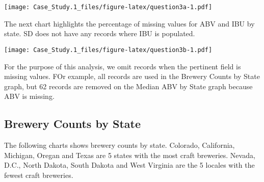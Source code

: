 \documentclass[]{article}
\newenvironment{Shaded}{\begin{snugshade}}{\end{snugshade}}
\newcommand{\DataTypeTok}[1]{\textcolor[rgb]{0.13,0.29,0.53}{#1}}
\newcommand{\DecValTok}[1]{\textcolor[rgb]{0.00,0.00,0.81}{#1}}
\newcommand{\FloatTok}[1]{\textcolor[rgb]{0.00,0.00,0.81}{#1}}
\newcommand{\KeywordTok}[1]{\textcolor[rgb]{0.13,0.29,0.53}{\textbf{#1}}}
\newcommand{\NormalTok}[1]{#1}
\newcommand{\OperatorTok}[1]{\textcolor[rgb]{0.81,0.36,0.00}{\textbf{#1}}}
\newcommand{\StringTok}[1]{\textcolor[rgb]{0.31,0.60,0.02}{#1}}
\begin{document}
\texttt{[image: Case\_Study.1\_files/figure-latex/question3a-1.pdf]}

The next chart highlights the percentage of missing values for ABV and
IBU by state. SD does not have any records where IBU is populated.

\begin{Shaded}
\end{Shaded}

\texttt{[image: Case\_Study.1\_files/figure-latex/question3b-1.pdf]}

For the purpose of this analysis, we omit records when the pertinent
field is missing values. FOr example, all records are used in the
Brewery Counts by State graph, but 62 records are removed on the Median
ABV by State graph because ABV is missing.

\hypertarget{brewery-counts-by-state}{%
\subsection{Brewery Counts by State}\label{brewery-counts-by-state}}

The following charts shows brewery counts by state. Colorado,
California, Michigan, Oregan and Texas are 5 states with the most craft
breweries. Nevada, D.C., North Dakota, South Dakota and West Virginia
are the 5 locales with the fewest craft breweries.
\end{document}

